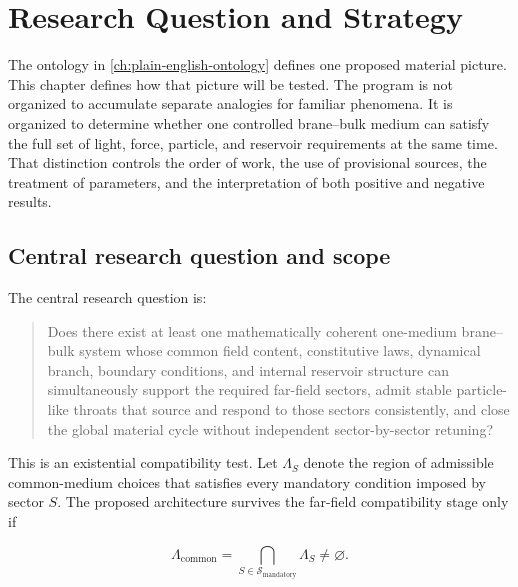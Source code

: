 
\chapter{Research Question and Strategy}
\label{ch:research-question-strategy}

The ontology in \cref{ch:plain-english-ontology} defines one proposed material
picture. This chapter defines how that picture will be tested. The program is
not organized to accumulate separate analogies for familiar phenomena. It is
organized to determine whether one controlled brane--bulk medium can satisfy the
full set of light, force, particle, and reservoir requirements at the same time.
That distinction controls the order of work, the use of provisional sources,
the treatment of parameters, and the interpretation of both positive and
negative results.

\section{Central research question and scope}

The central research question is:

\begin{quote}
Does there exist at least one mathematically coherent one-medium brane--bulk
system whose common field content, constitutive laws, dynamical branch,
boundary conditions, and internal reservoir structure can simultaneously
support the required far-field sectors, admit stable particle-like throats that
source and respond to those sectors consistently, and close the global material
cycle without independent sector-by-sector retuning?
\end{quote}

This is an existential compatibility test. Let \(\Lambda_S\) denote the region
of admissible common-medium choices that satisfies every mandatory condition
imposed by sector \(S\). The proposed architecture survives the far-field
compatibility stage only if

\[
\boxed{
\Lambda_{\mathrm{common}}
=
\bigcap_{S\in\mathcal S_{\mathrm{mandatory}}}\Lambda_S
\neq\varnothing.
}
\]


